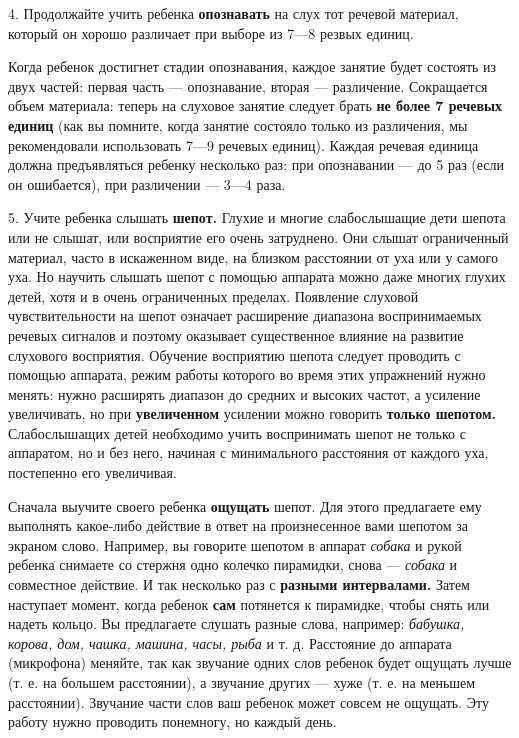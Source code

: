 \documentclass[a5paper]{book}
\renewcommand{\emph}[1]{\textit{#1}}
\begin{document}
4. Продолжайте учить ребенка \textbf{опознавать} на слух тот речевой
материал, который он хорошо различает при выборе из 7---8 резвых единиц.

Когда ребенок достигнет стадии опознавания, каждое занятие будет
состоять из двух частей: первая часть --- опознавание, вторая ---
различение. Сокращается объем материала: теперь на слуховое занятие
следует брать \textbf{не более 7 речевых единиц} (как вы помните, когда
занятие состояло только из различения, мы рекомендовали использовать
7---9 речевых единиц). Каждая речевая единица должна предъявляться
ребенку несколько раз: при опознавании --- до 5 раз (если он ошибается),
при различении --- 3---4 раза.

5. Учите ребенка слышать \textbf{шепот.} Глухие и многие слабослышащие
дети шепота или не слышат, или восприятие его очень затруднено. Они
слышат ограниченный материал, часто в искаженном виде, на близком
расстоянии от уха или у самого уха. Но научить слышать шепот с помощью
аппарата можно даже многих глухих детей, хотя и в очень ограниченных
пределах. Появление слуховой чувствительности на шепот означает
расширение диапазона воспринимаемых речевых сигналов и поэтому оказывает
существенное влияние на развитие слухового восприятия. Обучение
восприятию шепота следует проводить с помощью аппарата, режим работы
которого во время этих упражнений нужно менять: нужно расширять диапазон
до средних и высоких частот, а усиление увеличивать, но при
\textbf{увеличенном} усилении можно говорить \textbf{только шепотом.}
Слабослышащих детей необходимо учить воспринимать шепот не только с
аппаратом, но и без него, начиная с минимального расстояния от каждого
уха, постепенно его увеличивая.

Сначала выучите своего ребенка \textbf{ощущать} шепот. Для этого
предлагаете ему выполнять какое-либо действие в ответ на произнесенное
вами шепотом за экраном слово. Например, вы говорите шепотом в аппарат
\emph{собака} и рукой ребенка снимаете со стержня одно колечко
пирамидки, снова --- \emph{собака} и совместное действие. И так
несколько раз с \textbf{разными интервалами.} Затем наступает момент,
когда ребенок \textbf{сам} потянется к пирамидке, чтобы снять или надеть
кольцо. Вы предлагаете слушать разные слова, например: \emph{бабушка,
корова, дом, чашка, машина, часы, рыба} и т. д. Расстояние до аппарата
(микрофона) меняйте, так как звучание одних слов ребенок будет ощущать
лучше (т. е. на большем расстоянии), а звучание других --- хуже (т. е.
на меньшем расстоянии). Звучание части слов ваш ребенок может совсем не
ощущать. Эту работу нужно проводить понемногу, но каждый день.
\end{document}
